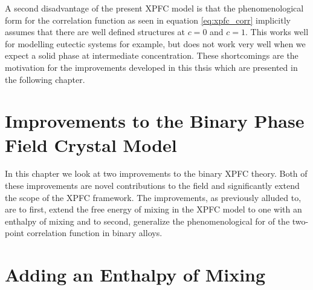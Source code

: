 \documentclass[showkeys, prb, reprint]{revtex4-1}
\begin{document}
A second disadvantage of the present XPFC model is that the phenomenological
form for the correlation function as seen in equation \ref{eq:xpfc_corr}
implicitly assumes that there are well defined structures at $c=0$ and $c=1$.
This works well for modelling eutectic systems for example, but does not work
very well when we expect a solid phase at intermediate concentration. These
shortcomings are the motivation for the improvements developed in this thsis
which are presented in the following chapter.

\section{Improvements to the Binary Phase Field Crystal Model} %

In this chapter we look at two improvements to the binary XPFC theory. Both of
these improvements are novel contributions to the field and significantly
extend the scope of the XPFC framework. The improvements, as previously alluded
to, are to first, extend the free energy of mixing in the XPFC model to one
with an enthalpy of mixing and to second, generalize the phenomenological
for of the two-point correlation function in binary alloys.

\section{Adding an Enthalpy of Mixing} %
\end{document}
